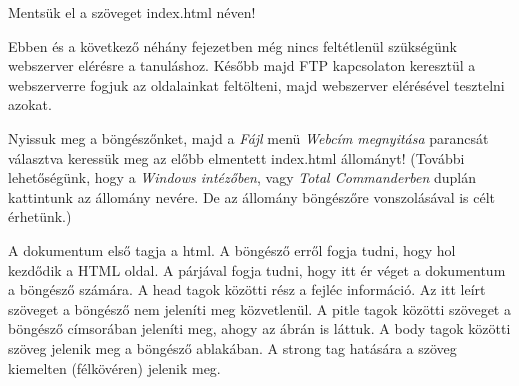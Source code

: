 \documentclass[12pt,twoside]{report}
\theoremstyle{definition}
\begin{document}


Mentsük el a szöveget index.html néven!

Ebben és a következő néhány fejezetben még nincs feltétlenül szükségünk webszerver elérésre a tanuláshoz. Később majd FTP kapcsolaton keresztül a webszerverre fogjuk az oldalainkat feltölteni, majd webszerver elérésével tesztelni azokat.

Nyissuk meg a böngészőnket, majd a \emph{Fájl} menü \emph{Webcím megnyitása} parancsát választva keressük meg az előbb elmentett index.html állományt! (További lehetőségünk, hogy a \emph{Windows intézőben}, vagy \emph{Total Commanderben} duplán kattintunk az állomány nevére. De az állomány böngészőre vonszolásával is célt érhetünk.)

A dokumentum első tagja a html. A böngésző erről fogja tudni, hogy hol kezdődik a HTML oldal. A párjával fogja tudni, hogy itt ér véget a dokumentum a böngésző számára. A head tagok közötti rész a fejléc információ. Az itt leírt szöveget a böngésző nem jeleníti meg közvetlenül. A pitle tagok közötti szöveget a böngésző címsorában jeleníti meg, ahogy az ábrán is láttuk. A body tagok közötti szöveg jelenik meg a böngésző ablakában. A strong tag hatására a szöveg kiemelten (félkövéren) jelenik meg.
\end{document}
